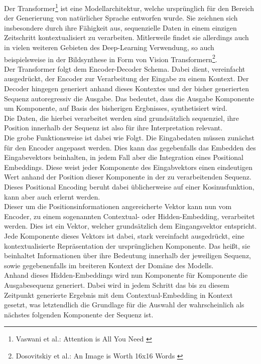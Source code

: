 Der Transformer\footnote{
    Vaswani et al.: Attention is All You Need
    \cite{vaswani2023attentionneed}
} ist eine Modellarchitektur, welche ursprünglich für den Bereich der Generierung von natürlicher Sprache entworfen wurde. Sie zeichnen sich insbesondere durch ihre Fähigkeit aus, sequenzielle Daten in einem einzigen Zeitschritt kontextualisiert zu verarbeiten. Mitlerweile findet sie allerdings auch in vielen weiteren Gebieten des Deep-Learning Verwendung, so auch beispielsweise in der Bildsynthese in Form von Vision Transformern\footnote{
    Dosovitskiy et al.: An Image is Worth 16x16 Words 
    \cite{dosovitskiy2021imageworth16x16words}
}. \\ 
Der Transformer folgt dem Encoder-Decoder Schema. Dabei dient, vereinfacht ausgedrückt, der Encoder zur Verarbeitung der Eingabe zu einem Kontext. Der Decoder hingegen generiert anhand dieses Kontextes und der bisher generierten Sequenz autoregressiv die Ausgabe. Das bedeutet, dass die Ausgabe Komponente um Komponente, auf Basis des bisherigen Ergbnisses, synthetisiert wird. \\ 
Die Daten, die hierbei verarbeitet werden sind grundsätzlich sequenziel, ihre Position innerhalb der Sequenz ist also für ihre Interpretation relevant. \\
Die grobe Funktionsweise ist dabei wie Folgt. Die Eingabedaten müssen zunächst für den Encoder angepasst werden. Dies kann das gegebenfalls das Embedden des Eingabevektors beinhalten, in jedem Fall aber die Integration eines Positional Embeddings. Diese weist jeder Komponente des Eingabvektors einen eindeutigen Wert anhand der Position dieser Komponente in der zu verarbeitenden Sequenz. Dieses Positional Encoding beruht dabei üblicherweise auf einer Kosinusfunktion, kann aber auch erlernt werden. \\
Dieser um die Positionsinformationen angereicherte Vektor kann nun vom Encoder, zu einem sogenannten Contextual- oder Hidden-Embedding, verarbeitet werden. Dies ist ein Vektor, welcher grundsätzlich dem Eingangsvektor entspricht. Jede Komponente dieses Vektors ist dabei, stark vereinfacht ausgedrückt, eine kontextualisierte Repräsentation der ursprünglichen Komponente. Das heißt, sie beinhaltet Informationen über ihre Bedeutung innerhalb der jeweiligen Sequenz, sowie gegebenenfalls im breiteren Kontext der Domäne des Modells. \\
Anhand dieses Hidden-Embeddings wird nun Komponente für Komponente die Ausgabesequenz generiert. Dabei wird in jedem Schritt das bis zu diesem Zeitpunkt generierte Ergebnis mit dem Contextual-Embedding in Kontext gesetzt, was letztendlich die Grundlage für die Auswahl der wahrscheinlich als nächstes folgenden Komponente der Sequenz ist.

